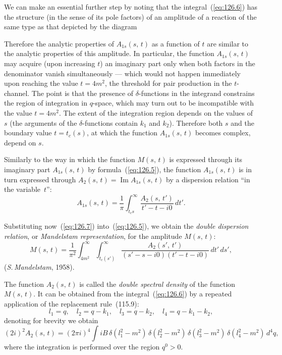 We can make an essential further step by noting that the integral~(\ref{eq:126.6}) has the structure (in the sense of its pole factors) of an amplitude of a reaction of the same type as that depicted by the diagram



Therefore the analytic properties of $A_{1s}(s,\,t)$ as a function of $t$ are similar to the analytic properties of this amplitude. In particular, the function $A_{1s}(s,\,t)$ may acquire (upon increasing $t$) an imaginary part only when both factors in the denominator vanish simultaneously --- which would not happen immediately upon reaching the value $t = 4m^2$, the threshold for pair production in the $t$-channel. The point is that the presence of $\delta$-functions in the integrand constrains the region of integration in $q$-space, which may turn out to be incompatible with the value $t = 4m^2$. The extent of the integration region depends on the values of $s$ (the arguments of the $\delta$-functions contain $k_1$ and $k_2$). Therefore both $s$ and the boundary value $t = t_c(s)$, at which the function $A_{1s}(s,\,t)$ becomes complex, depend on $s$.

Similarly to the way in which the function $M(s,\,t)$ is expressed through its imaginary part $A_{1s}(s,\,t)$ by formula~(\ref{eq:126.5}), the function $A_{1s}(s,\,t)$ is in turn expressed through $A_2(s,\,t) = \operatorname{Im} A_{1s}(s,\,t)$ by a dispersion relation ``in the variable~$t$'':
\begin{equation}
A_{1s}(s,\,t) = \frac{1}{\pi}\int_{t_c s}^{\infty} \frac{A_2(s,\,t')}{t' - t - i0}\,dt'.
\label{eq:126.7}
\end{equation}

Substituting now~(\ref{eq:126.7}) into~(\ref{eq:126.5}), we obtain the \emph{double dispersion relation}, or \emph{Mandelstam representation}, for the amplitude $M(s,\,t)$:
\begin{equation}
M(s,\,t) = \frac{1}{\pi^2}\int_{4m^2}^{\infty}\int_{t_c(s')}^{\infty} \frac{A_2(s',\,t')}{(s' - s - i0)(t' - t - i0)}\,dt'\,ds',
\label{eq:126.8}
\end{equation}
(\textit{S.\,Mandelstam}, 1958).

The function $A_2(s,\,t)$ is called the \emph{double spectral density} of the function $M(s,\,t)$. It can be obtained from the integral~(\ref{eq:126.6}) by a repeated application of the replacement rule~(115.9):
\begin{equation}
l_1 = q,\quad l_2 = q - k_1,\quad l_3 = q - k_2,\quad l_4 = q - k_1 - k_2,
\label{eq:126.9}
\end{equation}
denoting for brevity
we obtain
\begin{equation}
(2i)^2 A_2(s,\,t) = (2\pi i)^4\int iB\,\delta(l_1^2 - m^2)\,\delta(l_2^2 - m^2)\,\delta(l_3^2 - m^2)\,\delta(l_4^2 - m^2)\,d^4q,
\label{eq:126.10}
\end{equation}
where the integration is performed over the region $q^0 > 0$.

